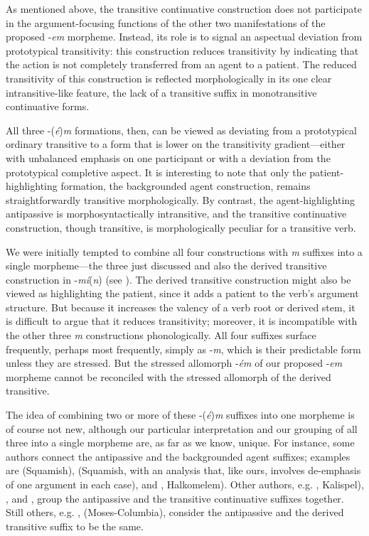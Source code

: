 \documentclass[output=paper,colorlinks,citecolor=brown]{langscibook}
\begin{document}
As mentioned above, the transitive continuative construction does not
participate in the argument-focusing functions of the other two
manifestations of the proposed -\emph{em} morpheme.  Instead, its
role is to signal an aspectual deviation from prototypical
transitivity: this construction reduces transitivity by indicating
that the action is not completely transferred from an agent to a
patient.  The reduced transitivity of this construction is reflected
morphologically in its one clear intransitive-like feature, the lack
of a transitive suffix in monotransitive continuative forms.


All three -(\emph{\'e})\emph{m}  formations, then, can be viewed as
 deviating from a prototypical ordinary transitive to a form that is
 lower on the transitivity gradient---either with unbalanced emphasis
 on one participant or with a deviation from the prototypical
 completive aspect.  It is interesting to note that only the
 patient-highlighting formation, the backgrounded agent construction,
 remains straightforwardly transitive morphologically.  By contrast,
 the agent-highlighting antipassive is morphosyntactically
 intransitive, and the transitive continuative construction, though
 transitive, is morphologically peculiar for a transitive verb.


We were initially tempted to combine all four constructions with
\emph{m} suffixes into a single morpheme---the three just discussed
and also the derived transitive construction in -\emph{m\'i}(\emph{n})
(see \citealt{S.Thomason&Everett:1993}).  The derived transitive
construction might also be viewed as highlighting the patient, since
it adds a patient to the verb's argument structure.  But because it
increases the valency of a verb root or derived stem, it is difficult
to argue that it reduces transitivity; moreover, it is incompatible
with the other three \emph{m} constructions phonologically.  All four
suffixes surface frequently, perhaps most frequently, simply as
-\emph{m}, which is their predictable form unless they are stressed.
But the stressed allomorph -\emph{\'em} of our proposed -\emph{em}
morpheme cannot be reconciled with the stressed allomorph of the
derived transitive.

The idea of combining two or more of these -(\emph{\'e})\emph{m}
 suffixes into one morpheme is of course not new, although our
 particular interpretation and our grouping of all three into a
 single morpheme are, as far as we know, unique.  For instance, some
 authors connect the antipassive and the backgrounded agent suffixes;
 examples are \citet{Kuipers:1967} (Squamish), \citet{Darnell:1990}
 (Squamish, with an analysis that, like ours, involves de-emphasis of
 one argument in each case), and \citet[185]{Gerdts:1989},
 Halkomelem).  Other authors, e.g. \citet[32]{Vogt:1940},
 Kalispel), \citet[158--59]{Newman:1980}, and
 \citet[294]{Kroeber:1991}, group the antipassive and the
 transitive continuative suffixes together.  Still others,
 e.g. \citet[105]{Kinkade:1981}, (Moses-Columbia), consider the
 antipassive and the derived transitive suffix to be the same.
\end{document}
